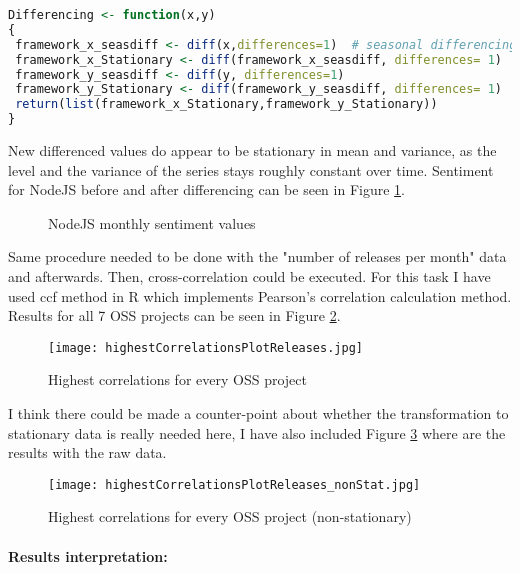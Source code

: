 \begin{lstlisting}[caption={Used differencing method in R},label={lst:differencing},language=R]
Differencing <- function(x,y)
{
 framework_x_seasdiff <- diff(x,differences=1)  # seasonal differencing
 framework_x_Stationary <- diff(framework_x_seasdiff, differences= 1)
 framework_y_seasdiff <- diff(y, differences=1)
 framework_y_Stationary <- diff(framework_y_seasdiff, differences= 1)
 return(list(framework_x_Stationary,framework_y_Stationary))
}
\end{lstlisting}
New differenced values do appear to be stationary in mean and variance, as the level and the variance of the series stays roughly constant over time. Sentiment for NodeJS before and after differencing can be seen in Figure \ref{fig:NodeJS_Sentiment_before_after}.
\begin{figure}[H]%
    \centering
    \qquad
    \caption{NodeJS monthly sentiment values}%
    \label{fig:NodeJS_Sentiment_before_after}%
\end{figure}
Same procedure needed to be done with the "number of releases per month" data and afterwards. Then, cross-correlation could be executed. For this task I have used ccf method in R which implements Pearson's correlation calculation method. Results for all 7 OSS projects can be seen in Figure \ref{fig:highestCorrelationsPlotReleases}.\\
\begin{figure}[H]%
    \centering
	\texttt{[image: highestCorrelationsPlotReleases.jpg]}
    \caption{Highest correlations for every OSS project}%
    \label{fig:highestCorrelationsPlotReleases}%
\end{figure}
I think there could be made a counter-point about whether the transformation to stationary data is really needed here, I have also included Figure \ref{fig:highestCorrelationsPlotReleases_nonStat} where are the results with the raw data.

\begin{figure}[H]%
    \centering
	\texttt{[image: highestCorrelationsPlotReleases\_nonStat.jpg]}
    \caption{Highest correlations for every OSS project (non-stationary)}%
    \label{fig:highestCorrelationsPlotReleases_nonStat}%
\end{figure}

\paragraph{Results interpretation:}

